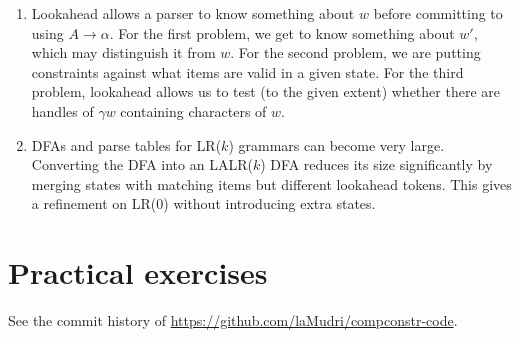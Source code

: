 \documentclass{article}
\begin{document}
\begin{enumerate}
\begin{enumerate}
      \item Lookahead allows a parser to know something about $w$ before committing to using $A \to \alpha$. For the first problem, we get to know something about $w'$, which may distinguish it from $w$. For the second problem, we are putting constraints against what items are valid in a given state. For the third problem, lookahead allows us to test (to the given extent) whether there are handles of $\gamma w$ containing characters of $w$.
      \item DFAs and parse tables for LR($k$) grammars can become very large. Converting the DFA into an LALR($k$) DFA reduces its size significantly by merging states with matching items but different lookahead tokens. This gives a refinement on LR($0$) without introducing extra states.
    \end{enumerate}
\end{enumerate}

\section*{Practical exercises}
See the commit history of \url{https://github.com/laMudri/compconstr-code}.
\end{document}
